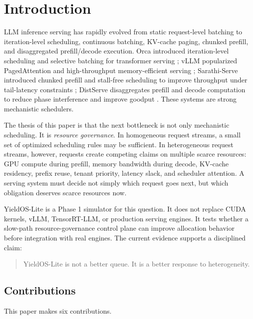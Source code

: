 \documentclass[11pt]{article}
\begin{document}
\section{Introduction}

LLM inference serving has rapidly evolved from static request-level batching to iteration-level scheduling, continuous batching, KV-cache paging, chunked prefill, and disaggregated prefill/decode execution. Orca introduced iteration-level scheduling and selective batching for transformer serving \cite{orca}; vLLM popularized PagedAttention and high-throughput memory-efficient serving \cite{vllmblog,pagedattention}; Sarathi-Serve introduced chunked prefill and stall-free scheduling to improve throughput under tail-latency constraints \cite{sarathi}; DistServe disaggregates prefill and decode computation to reduce phase interference and improve goodput \cite{distserve}. These systems are strong mechanistic schedulers.

The thesis of this paper is that the next bottleneck is not only mechanistic scheduling. It is \emph{resource governance}. In homogeneous request streams, a small set of optimized scheduling rules may be sufficient. In heterogeneous request streams, however, requests create competing claims on multiple scarce resources: GPU compute during prefill, memory bandwidth during decode, KV-cache residency, prefix reuse, tenant priority, latency slack, and scheduler attention. A serving system must decide not simply which request goes next, but which obligation deserves scarce resources now.

YieldOS-Lite is a Phase 1 simulator for this question. It does not replace CUDA kernels, vLLM, TensorRT-LLM, or production serving engines. It tests whether a slow-path resource-governance control plane can improve allocation behavior before integration with real engines. The current evidence supports a disciplined claim:

\begin{quote}
YieldOS-Lite is not a better queue. It is a better response to heterogeneity.
\end{quote}

\subsection{Contributions}

This paper makes six contributions.
\end{document}

